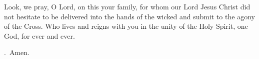 \lettrine[lines=3]{L}{}ook, we pray, O Lord, on this your family,
for whom our Lord Jesus Christ
did not hesitate to be delivered into the hands of the wicked
and submit to the agony of the Cross.
Who lives and reigns with you
in the unity of the Holy Spirit,
one God, for ever and ever. \par \Rbar.~Amen.
